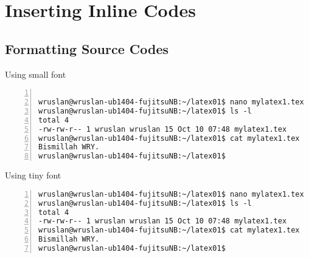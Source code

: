 \chapter{Inserting Inline Codes} 
\label{AppendixD} 


\section{Formatting Source Codes}


Using small font

\lstset{basicstyle=\ttfamily\small} 
\begin{lstlisting}[breaklines, frame=single, numbers=left, caption={Create mylatex1.tex file using nano small font}, label=commandline-02]     

wruslan@wruslan-ub1404-fujitsuNB:~/latex01$ nano mylatex1.tex
wruslan@wruslan-ub1404-fujitsuNB:~/latex01$ ls -l
total 4
-rw-rw-r-- 1 wruslan wruslan 15 Oct 10 07:48 mylatex1.tex
wruslan@wruslan-ub1404-fujitsuNB:~/latex01$ cat mylatex1.tex 
Bismillah WRY.
wruslan@wruslan-ub1404-fujitsuNB:~/latex01$ 

\end{lstlisting}      


Using tiny font
    
\lstset{basicstyle=\ttfamily\tiny} 
\begin{lstlisting}[breaklines, frame=single, numbers=left, caption={Create mylatex1.tex file using nano tiny font}, label=commandline-02]     
wruslan@wruslan-ub1404-fujitsuNB:~/latex01$ nano mylatex1.tex
wruslan@wruslan-ub1404-fujitsuNB:~/latex01$ ls -l
total 4
-rw-rw-r-- 1 wruslan wruslan 15 Oct 10 07:48 mylatex1.tex
wruslan@wruslan-ub1404-fujitsuNB:~/latex01$ cat mylatex1.tex 
Bismillah WRY.
wruslan@wruslan-ub1404-fujitsuNB:~/latex01$ 
\end{lstlisting}      
        
    